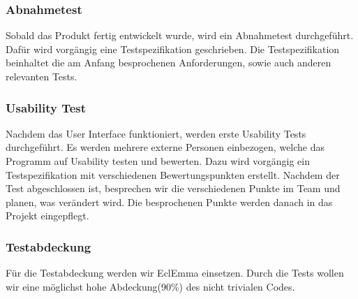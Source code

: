 \documentclass[a4,12pt]{scrartcl}
\begin{document}
\subsubsection{Abnahmetest}
Sobald das Produkt fertig entwickelt wurde, wird ein Abnahmetest durchgeführt.
Dafür wird vorgängig eine Testspezifikation geschrieben.
Die Testspezifikation beinhaltet die am Anfang besprochenen Anforderungen, sowie auch anderen relevanten Tests.

\subsubsection{Usability Test}
Nachdem das User Interface funktioniert, werden erste Usability Tests durchgeführt.
Es werden mehrere externe Personen einbezogen, welche das Programm auf Usability testen und bewerten.
Dazu wird vorgängig ein Testspezifikation mit verschiedenen Bewertungspunkten erstellt.
Nachdem der Test abgeschlossen ist, besprechen wir die verschiedenen Punkte im Team und planen, was verändert wird.
Die besprochenen Punkte werden danach in das Projekt eingepflegt.

\subsubsection{Testabdeckung}
Für die Testabdeckung werden wir EclEmma einsetzen.
Durch die Tests wollen wir eine möglichst hohe Abdeckung(90\%) des nicht trivialen Codes.
\end{document}
